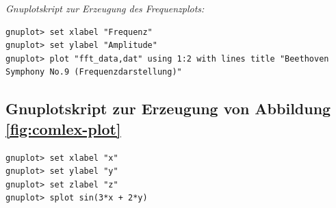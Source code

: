 \documentclass[paper=a4,fontsize=12pt,ngerman]{scrartcl}
\begin{document}
\textit{Gnuplotskript zur Erzeugung des Frequenzplots:}
\begin{lstlisting}
gnuplot> set xlabel "Frequenz"
gnuplot> set ylabel "Amplitude"
gnuplot> plot "fft_data,dat" using 1:2 with lines title "Beethoven Symphony No.9 (Frequenzdarstellung)"
\end{lstlisting}

\subsection{Gnuplotskript zur Erzeugung von Abbildung \ref{fig:comlex-plot}}
\begin{lstlisting}
gnuplot> set xlabel "x"
gnuplot> set ylabel "y"
gnuplot> set zlabel "z"
gnuplot> splot sin(3*x + 2*y)
\end{lstlisting}

\clearpage
\renewcommand\refname{Literaturverzeichnis}




\clearpage
\end{document}
